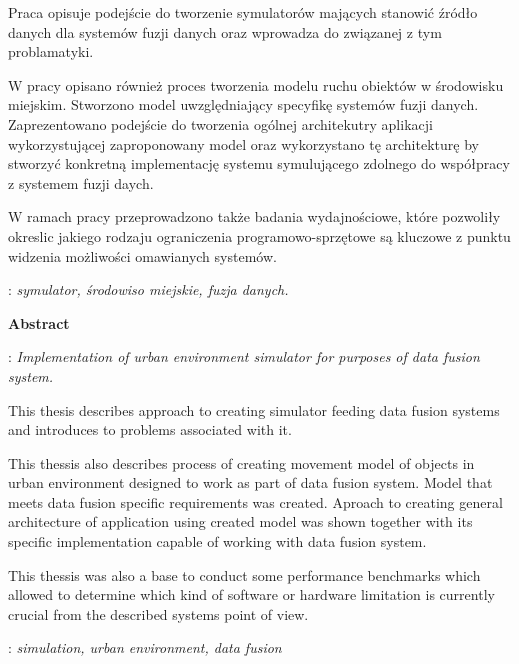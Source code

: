 \begin{titlepage}
    {\itshape
    \par{
    Praca opisuje podejście do tworzenie symulatorów mających stanowić źródło danych dla systemów fuzji danych oraz wprowadza do związanej z tym problamatyki.
	}    
    \par{
	W pracy opisano również proces tworzenia modelu ruchu obiektów w środowisku miejskim. Stworzono model uwzględniający specyfikę systemów fuzji danych. Zaprezentowano podejście do tworzenia ogólnej architekutry aplikacji wykorzystującej zaproponowany model oraz wykorzystano tę architekturę by stworzyć konkretną implementację systemu symulującego zdolnego do współpracy z systemem fuzji daych.
	}
	\par{
	W ramach pracy przeprowadzono także badania wydajnościowe, które pozwoliły okreslic jakiego rodzaju ograniczenia programowo-sprzętowe są kluczowe z punktu widzenia możliwości omawianych systemów.
	}
    }
    \vspace*{1\baselineskip}

    : {\itshape symulator, środowiso miejskie, fuzja danych.}
    \par
    \vspace{4\baselineskip}
    \begin{center}
	{\large\bfseries Abstract}\par\bigskip
    \end{center}
    : {\itshape Implementation of urban environment simulator for purposes of data fusion system.
    }\par
    \vspace*{1\baselineskip}
    {\itshape
    \par{
    This thesis describes approach to creating simulator feeding data fusion systems and introduces to problems associated with it.
	}
    \par{
    This thessis also describes process of creating movement model of objects in urban environment designed to work as part of data fusion system. Model that meets data fusion specific requirements was created. Aproach to creating general architecture of application using created model was shown together with its specific implementation capable of working with data fusion system.
	}
	\par{
	This thessis was also a base to conduct some performance benchmarks which allowed to determine which kind of software or hardware limitation is currently crucial from the described systems point of view.
	}
    }
    \vspace*{1\baselineskip}

    : {\itshape simulation, urban environment, data fusion}

\end{titlepage}

